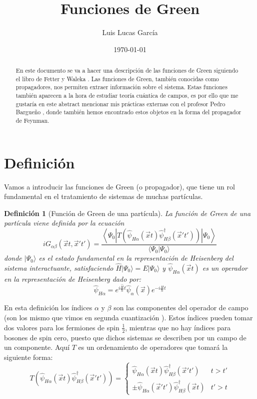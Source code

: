 \documentclass{article} %
\author{Luis Lucas García}
\title{Funciones de Green}
\date{\today}
\newtheorem{definition}{Definición}
\begin{document}
\maketitle
\begin{abstract}
    En este documento se va a hacer una descripción de las funciones de Green siguiendo el libro de Fetter y Waleka \cite{fetter1971quantum}. Las funciones de Green, también conocidas como propagadores, nos permiten extraer información sobre el sistema. Estas funciones también aparecen a la hora de estudiar teoría cuántica de campos, es por ello que me gustaría en este abstract mencionar mis prácticas externas con el profesor Pedro Bargueño \cite{luis2025qft}, donde también hemos encontrado estos objetos en la forma del propagador de Feynman.
\end{abstract}
\tableofcontents
\section{Definición}

Vamos a introducir las funciones de Green (o propagador), que tiene un rol fundamental en el tratamiento de sistemas de muchas partículas.
\begin{definition}[Función de Green de una partícula]
    La función de Green de una partícula viene definida por la ecuación
    \begin{equation}
        iG_{\alpha\beta}(\vec{x}t, \vec{x}'t') = \frac{\left\langle\Psi_0|T\left(\hat{\psi}_{H\alpha}(\vec{x}t)\hat{\psi}^{\dagger}_{H\beta}(\vec{x}'t')\right)|\Psi_0\right\rangle}{\langle\Psi_0|\Psi_0\rangle}
        \label{eq:GreenFunction}
    \end{equation}
    donde $|\Psi_0\rangle$ es el estado fundamental en la representación de Heisenberg del sistema interactuante, satisfaciendo $\hat{H}|\Psi_0\rangle = E|\Psi_0\rangle$ y $\hat{\psi}_{H\alpha}(\vec{x}t)$ es un operador en la representación de Heisenberg dado por:
    \begin{equation}
        \hat{\psi}_{H\alpha} = e^{i\frac{\hat{H}}{\hbar}t}\hat{\psi}_{\alpha}(\vec{x})e^{-i\frac{H}{\hbar}t}
    \end{equation}
\end{definition}

En esta definición los índices $\alpha$ y $\beta$ son las componentes del operador de campo (son los mismo que vimos en segunda cuantización \cite{luis2024avq}). Estos índices pueden tomar dos valores para los fermiones de spin $\frac{1}{2}$, mientras que no hay índices para bosones de spin cero, puesto que dichos sistemas se describen por un campo de un componente. Aquí $T$ es un ordenamiento de operadores que tomará la siguiente forma:
\begin{equation}
    T\left(\hat{\psi}_{H\alpha}(\vec{x}t)\hat{\psi}^{\dagger}_{H\beta}(\vec{x}'t')\right) = \left\{\begin{array}{cc}
        \hat{\psi}_{H\alpha}(\vec{x}t)\hat{\psi}^{\dagger}_{H\beta}(\vec{x}'t') & t > t' \\
        \pm\hat{\psi}_{H\alpha}(\vec{x}'t')\hat{\psi}^{\dagger}_{H\beta}(\vec{x}t) & t' > t
    \end{array}\right.
\end{equation}
\end{document}
